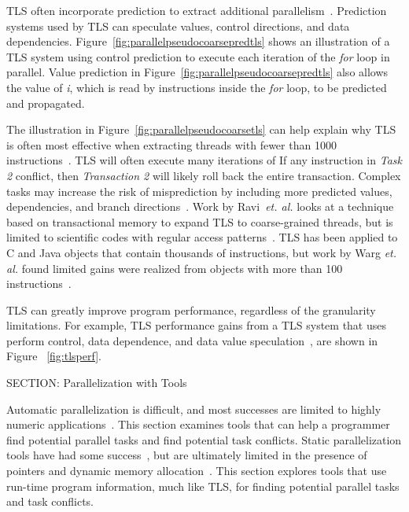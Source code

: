{TLS often incorporate prediction to extract additional parallelism~\cite{kejariwal:2007:tap}.  Prediction systems used by TLS can speculate values, control directions, and data dependencies. Figure~\ref{fig:parallelpseudocoarsepredtls} shows an illustration of a TLS system using control prediction to execute each iteration of the \textit{for} loop in parallel.  Value prediction in Figure~\ref{fig:parallelpseudocoarsepredtls} also allows the value of \textit{i}, which is read by instructions inside the \textit{for} loop, to be predicted and propagated.

The illustration in Figure~\ref{fig:parallelpseudocoarsetls} can help explain why TLS is often most effective when extracting threads with fewer than 1000 instructions~\cite{marcuello:00:ipdps}.  TLS will often execute many iterations of If any instruction in \textit{Task 2} conflict, then \textit{Transaction 2} will likely roll back the entire transaction.  Complex tasks may increase the risk of misprediction by including more predicted values, dependencies, and branch directions~\cite{marcuello:00:ipdps}. Work by Ravi~\textit{et. al.} looks at a technique based on transactional memory to expand TLS to coarse-grained threads, but is limited to scientific codes with regular access patterns~\cite{ramaseshan:08:nc}. TLS has been applied to C and Java objects that contain thousands of instructions, but work by Warg \textit{et. al.} found limited gains were realized from objects with more than 100 instructions~\cite{warg:2001:pact}.

TLS can greatly improve program performance, regardless of the granularity limitations. For example, TLS performance gains from a TLS system that uses perform control, data dependence, and data value speculation~\cite{kejariwal:2007:tap}, are shown in Figure ~\ref{fig:tlsperf}.

SECTION: Parallelization with Tools


Automatic parallelization is difficult, and most successes are limited to highly numeric applications~\cite{larus:1993:pads,ramaseshan:08:nc}.  This section examines tools that can help a programmer find potential parallel tasks and find potential task conflicts.  Static parallelization tools have had some success~\cite{kennedy:91:pads}, but are ultimately limited in the presence of pointers and dynamic memory allocation~\cite{minjang:10:micro}. This section explores tools that use run-time program information, much like TLS, for finding potential parallel tasks and task conflicts.

}
